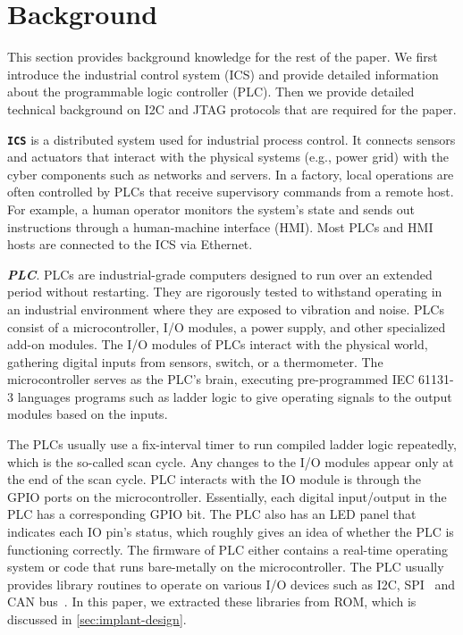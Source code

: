 \section{Background}
\label{sec:implant-background}

This section provides background knowledge for the rest of the paper. We first introduce the industrial control system (ICS) and provide detailed information about the programmable logic controller (PLC). Then we provide detailed technical background on I2C and JTAG protocols that are required for the paper.

\textbf{\texttt{ICS}} is a distributed system used for industrial process control. It connects sensors and actuators that interact with the physical systems (e.g., power grid) with the cyber components such as networks and servers. In a factory, local operations are often controlled by PLCs that receive supervisory commands from a remote host. For example, a human operator monitors the system's state and sends out instructions through a human-machine interface (HMI). Most PLCs and HMI hosts are connected to the ICS via Ethernet.

\textbf{\textit{PLC}}. PLCs are industrial-grade computers designed to run over an extended period without restarting. They are rigorously tested to withstand operating in an industrial environment where they are exposed to vibration and noise. PLCs consist of a microcontroller, I/O modules, a power supply, and other specialized add-on modules. The I/O modules of PLCs interact with the physical world, gathering digital inputs from sensors, switch, or a thermometer. The microcontroller serves as the PLC's brain, executing pre-programmed IEC 61131-3 languages programs such as ladder logic to give operating signals to the output modules based on the inputs. 

The PLCs usually use a fix-interval timer to run compiled ladder logic repeatedly, which is the so-called scan cycle. Any changes to the I/O modules appear only at the end of the scan cycle. PLC interacts with the IO module is through the GPIO ports on the microcontroller. Essentially, each digital input/output in the PLC has a corresponding GPIO bit. The PLC also has an LED panel that indicates each IO pin's status, which roughly gives an idea of whether the PLC is functioning correctly. The firmware of PLC either contains a real-time operating system or code that runs bare-metally on the microcontroller. The PLC usually provides library routines to operate on various I/O devices such as I2C, SPI~\cite{leens2009introduction} and CAN bus~\cite{bozdal2018survey}. In this paper, we extracted these libraries from ROM, which is discussed in  \autoref{sec:implant-design}.

